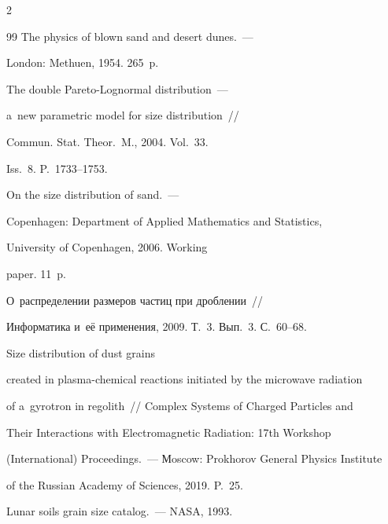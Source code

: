 \begin{multicols}{2}
{{\begin{thebibliography}{99}
 The physics of blown sand and desert dunes.~--- 


London: Methuen, 1954. 265~p.







 The double Pareto-Lognormal distribution~--- 


a~new parametric model for size distribution~//


Commun. Stat. Theor.~M., 2004. Vol.~33. 


Iss.~8. P.~1733--1753.







 On the size distribution of sand.~--- 


Copenhagen: Department of Applied Mathematics and Statistics, 


University of Copenhagen, 2006.  Working 


paper. 11~p.







 О~распределении размеров частиц при дроблении~// 


Информатика и~её применения, 2009. Т.~3. Вып.~3. С.~60--68.







 Size distribution of dust grains 


created in plasma-chemical reactions initiated by the microwave radiation 


of a~gyrotron in regolith~// Complex Systems of Charged Particles and 


Their Interactions with Electromagnetic Radiation: 17th Workshop 


(International) Proceedings.~--- Мoscow: Prokhorov General Physics Institute 


of the Russian Academy of Sciences, 2019. P.~25.







 Lunar soils grain size catalog.~--- NASA, 1993. 



\end{thebibliography}}}
\end{multicols}
